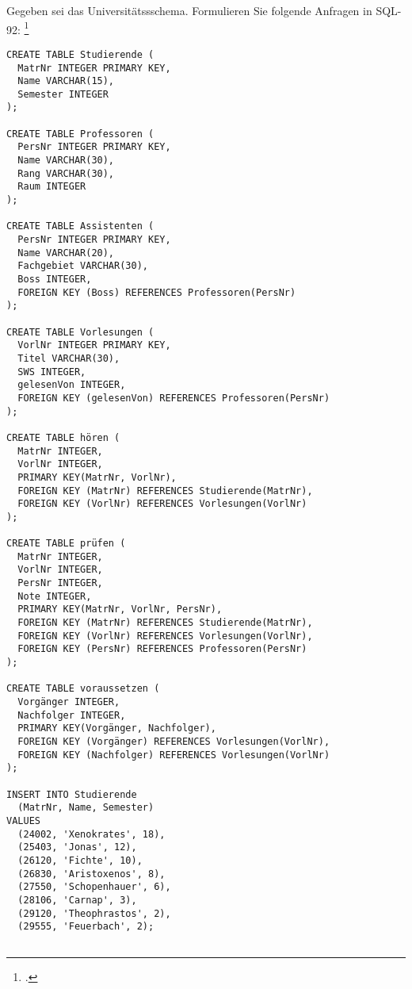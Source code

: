 \documentclass{lehramt-informatik-aufgabe}
\begin{document}

Gegeben sei das Universitätssschema. Formulieren Sie folgende Anfragen
in SQL-92:
\footcite{examen:66116:2020:03}

\begin{verbatim}
CREATE TABLE Studierende (
  MatrNr INTEGER PRIMARY KEY,
  Name VARCHAR(15),
  Semester INTEGER
);

CREATE TABLE Professoren (
  PersNr INTEGER PRIMARY KEY,
  Name VARCHAR(30),
  Rang VARCHAR(30),
  Raum INTEGER
);

CREATE TABLE Assistenten (
  PersNr INTEGER PRIMARY KEY,
  Name VARCHAR(20),
  Fachgebiet VARCHAR(30),
  Boss INTEGER,
  FOREIGN KEY (Boss) REFERENCES Professoren(PersNr)
);

CREATE TABLE Vorlesungen (
  VorlNr INTEGER PRIMARY KEY,
  Titel VARCHAR(30),
  SWS INTEGER,
  gelesenVon INTEGER,
  FOREIGN KEY (gelesenVon) REFERENCES Professoren(PersNr)
);

CREATE TABLE hören (
  MatrNr INTEGER,
  VorlNr INTEGER,
  PRIMARY KEY(MatrNr, VorlNr),
  FOREIGN KEY (MatrNr) REFERENCES Studierende(MatrNr),
  FOREIGN KEY (VorlNr) REFERENCES Vorlesungen(VorlNr)
);

CREATE TABLE prüfen (
  MatrNr INTEGER,
  VorlNr INTEGER,
  PersNr INTEGER,
  Note INTEGER,
  PRIMARY KEY(MatrNr, VorlNr, PersNr),
  FOREIGN KEY (MatrNr) REFERENCES Studierende(MatrNr),
  FOREIGN KEY (VorlNr) REFERENCES Vorlesungen(VorlNr),
  FOREIGN KEY (PersNr) REFERENCES Professoren(PersNr)
);

CREATE TABLE voraussetzen (
  Vorgänger INTEGER,
  Nachfolger INTEGER,
  PRIMARY KEY(Vorgänger, Nachfolger),
  FOREIGN KEY (Vorgänger) REFERENCES Vorlesungen(VorlNr),
  FOREIGN KEY (Nachfolger) REFERENCES Vorlesungen(VorlNr)
);

INSERT INTO Studierende
  (MatrNr, Name, Semester)
VALUES
  (24002, 'Xenokrates', 18),
  (25403, 'Jonas', 12),
  (26120, 'Fichte', 10),
  (26830, 'Aristoxenos', 8),
  (27550, 'Schopenhauer', 6),
  (28106, 'Carnap', 3),
  (29120, 'Theophrastos', 2),
  (29555, 'Feuerbach', 2);


\end{verbatim}
\end{document}
